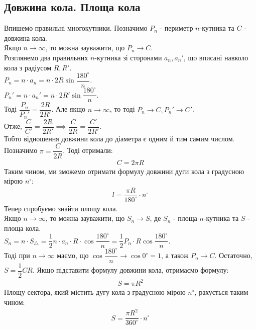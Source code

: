 \documentclass[a4paper, 10pt]{article}
\theoremstyle{theoremdd}
\theoremstyle{theoremdd}
\theoremstyle{theoremdd}
\theoremstyle{theoremdd}
\theoremstyle{theoremdd}
\theoremstyle{theoremdd}
\theoremstyle{theoremdd}
\theoremstyle{theoremdd}
\theoremstyle{theoremdd}
\begin{document}
\subsection{Довжина кола. Площа кола}
Впишемо правильні многокутники. Позначимо $P_n$ - периметр $n$-кутника та $C$ - довжина кола. \\
Якщо $n \to \infty$, то можна зауважити, що $P_n \to C$.
\bigskip \\
Розглянемо два правильних $n$-кутника зі сторонами $a_n, a_n'$, що вписані навколо кола з радіусом $R,R'$.\\
$P_n = n \cdot a_n = n \cdot 2R \sin \dfrac{180^\circ}{n}$.\\
$P_n' = n \cdot a_n' = n \cdot 2R' \sin \dfrac{180^\circ}{n}$.\\
Тоді $\dfrac{P_n}{P_n'} = \dfrac{2R}{2R'}$. Але якщо $n \to \infty$, то тоді $P_n \to C, P_n' \to C'$.\\
Отже, $\dfrac{C}{C'} = \dfrac{2R}{2R'} \implies \dfrac{C}{2R} = \dfrac{C'}{2R'}$.\\
Тобто відношення довжини кола до діаметра є одним й тим самим числом.\\
Позначимо $\pi = \dfrac{C}{2R}$. Тоді отримали:
\begin{align*}
C = 2\pi R
\end{align*}
Таким чином, ми зможемо отримати формулу довжини дуги кола з градусною мірою $n^\circ$:
\begin{align*}
l = \dfrac{\pi R}{180^\circ} \cdot n^\circ
\end{align*}
Тепер спробуємо знайти площу кола.\\
Якщо $n \to \infty$, то можна зауважити, що $S_n \to S$, де $S_n$ - площа $n$-кутника та $S$ - площа кола.
\bigskip \\
$S_n = n \cdot S_{\triangle} = \dfrac{1}{2} n \cdot a_n \cdot R \cdot \cos \dfrac{180^\circ}{n} = \dfrac{1}{2} P_n \cdot R \cos \dfrac{180^\circ}{n}$.\\
Тоді при $n \to \infty$ маємо, що $\cos \dfrac{180^\circ}{n} \to \cos 0^\circ = 1$, а також $P_n \to C$. Остаточно,\\
$S = \dfrac{1}{2} CR$. Якщо підставити формулу довжини кола, отримаємо формулу:
\begin{align*}
S = \pi R^2
\end{align*}
Площу сектора, який містить дугу кола з градусною мірою $n^\circ$, рахується таким чином:
\begin{align*}
S = \dfrac{\pi R^2}{360^\circ} \cdot n^\circ
\end{align*}
\newpage
\end{document}
